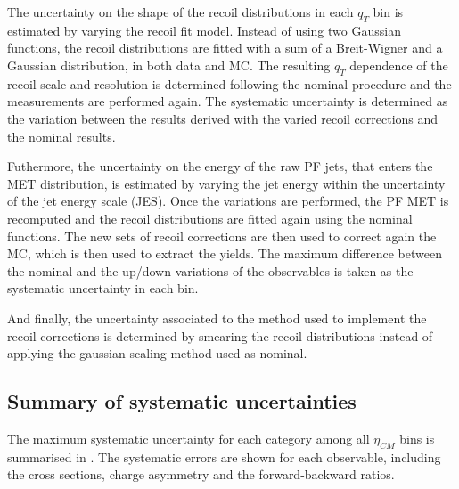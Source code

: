 The uncertainty on the shape of the recoil distributions in each $q_{T}$ bin is estimated by varying the recoil fit model. Instead of using two Gaussian functions, the recoil distributions are fitted with a sum of a Breit-Wigner and a Gaussian distribution, in both data and MC. The resulting $q_{T}$ dependence of the recoil scale and resolution is determined following the nominal procedure and the measurements are performed again. The systematic uncertainty is determined as the variation between the results derived with the varied recoil corrections and the nominal results.

Futhermore, the uncertainty on the energy of the raw PF jets, that enters the MET distribution, is estimated by varying the jet energy within the uncertainty of the jet energy scale (JES). Once the variations are performed, the PF MET is recomputed and the recoil distributions are fitted again using the nominal functions. The new sets of recoil corrections are then used to correct again the MC, which is then used to extract the \W yields. The maximum difference between the nominal and the up/down variations of the observables is taken as the systematic uncertainty in each bin.

And finally, the uncertainty associated to the method used to implement the recoil corrections is determined by smearing the recoil distributions instead of applying the gaussian scaling method used as nominal.

\subsection{Summary of systematic uncertainties}

The maximum systematic uncertainty for each category among all $\eta_{CM}$ bins is summarised in . The systematic errors are shown for each observable, including the \W cross sections, \W charge asymmetry and the forward-backward ratios.





